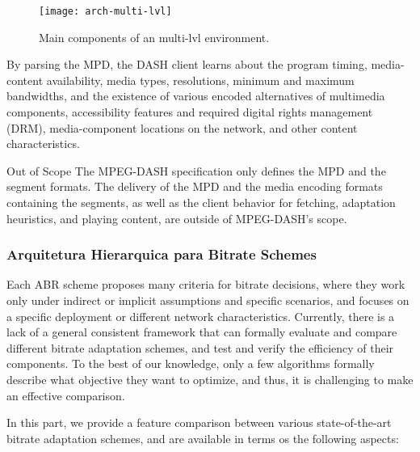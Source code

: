 \begin{figure}[htb]
  \centering
  \texttt{[image: arch-multi-lvl]}
  \caption{Main components of an multi-lvl environment.}
  \label{fig:arch-multi-lvl}
\end{figure}


By parsing the MPD, the DASH client learns about the program timing, media-content availability, media types, resolutions, minimum and maximum bandwidths, and the existence of various encoded alternatives of multimedia components, accessibility features and required digital rights management (DRM), media-component locations on the network, and other content characteristics. 

Out of Scope
The MPEG-DASH specification only defines the MPD and the segment formats. The delivery of the MPD and the media encoding formats containing the segments, as well as the client behavior for fetching, adaptation heuristics, and playing content, are outside of MPEG-DASH’s scope.


\subsubsection{Arquitetura Hierarquica para Bitrate Schemes}
\label{subsec:bitrate-schemes}


Each ABR scheme proposes many criteria for bitrate decisions, where they work only under
indirect or implicit assumptions and specific scenarios, and focuses on a specific deployment or
different network characteristics. Currently, there is a lack of a general consistent framework
that can formally evaluate and compare different bitrate adaptation schemes, and test and
verify the efficiency of their components. To the best of our knowledge, only a few algorithms
formally describe what objective they want to optimize, and thus, it is challenging to make
an effective comparison.

In this part, we provide a feature comparison between various state-of-the-art bitrate
adaptation schemes, and are available in terms os the following aspects:

